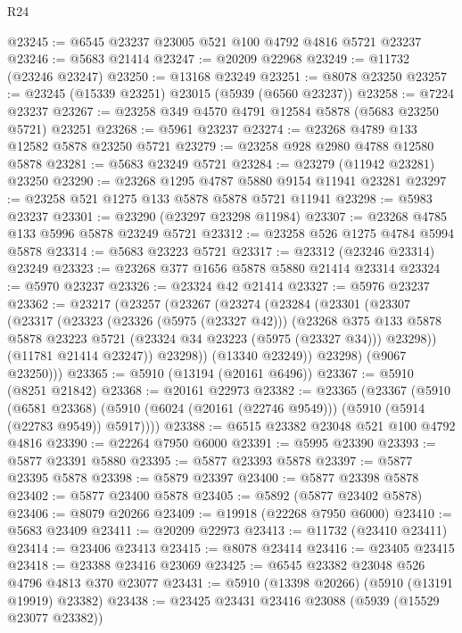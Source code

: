 \begin{lexlean}{R24}
\begin{coremodule}
@23245 := @6545 @23237 @23005 @521 @100 @4792 @4816 @5721 @23237
@23246 := @5683 @21414
@23247 := @20209 @22968
@23249 := @11732 (@23246 @23247)
@23250 := @13168 @23249
@23251 := @8078 @23250
@23257 := @23245 (@15339 @23251) @23015 (@5939 (@6560 @23237))
@23258 := @7224 @23237
@23267 := @23258 @349 @4570 @4791 @12584 @5878 (@5683 @23250 @5721) @23251
@23268 := @5961 @23237
@23274 := @23268 @4789 @133 @12582 @5878 @23250 @5721
@23279 := @23258 @928 @2980 @4788 @12580 @5878
@23281 := @5683 @23249 @5721
@23284 := @23279 (@11942 @23281) @23250
@23290 := @23268 @1295 @4787 @5880 @9154 @11941 @23281
@23297 := @23258 @521 @1275 @133 @5878 @5878 @5721 @11941
@23298 := @5983 @23237
@23301 := @23290 (@23297 @23298 @11984)
@23307 := @23268 @4785 @133 @5996 @5878 @23249 @5721
@23312 := @23258 @526 @1275 @4784 @5994 @5878
@23314 := @5683 @23223 @5721
@23317 := @23312 (@23246 @23314) @23249
@23323 := @23268 @377 @1656 @5878 @5880 @21414 @23314
@23324 := @5970 @23237
@23326 := @23324 @42 @21414
@23327 := @5976 @23237
@23362 := @23217
    (@23257
      (@23267
        (@23274
          (@23284
            (@23301
              (@23307
                (@23317
                  (@23323
                    (@23326 (@5975 (@23327 @42)))
                    (@23268
                      @375
                      @133
                      @5878
                      @5878
                      @23223
                      @5721
                      (@23324 @34 @23223 (@5975 (@23327 @34)))
                      @23298))
                  (@11781 @21414 @23247))
                @23298))
            (@13340 @23249))
          @23298)
        (@9067 @23250)))
@23365 := @5910 (@13194 (@20161 @6496))
@23367 := @5910 (@8251 @21842)
@23368 := @20161 @22973
@23382 := @23365
    (@23367
      (@5910
        (@6581 @23368)
        (@5910 (@6024 (@20161 (@22746 @9549))) (@5910 (@5914 (@22783 @9549)) @5917))))
@23388 := @6515 @23382 @23048 @521 @100 @4792 @4816
@23390 := @22264 @7950 @6000
@23391 := @5995 @23390
@23393 := @5877 @23391 @5880
@23395 := @5877 @23393 @5878
@23397 := @5877 @23395 @5878
@23398 := @5879 @23397
@23400 := @5877 @23398 @5878
@23402 := @5877 @23400 @5878
@23405 := @5892 (@5877 @23402 @5878)
@23406 := @8079 @20266
@23409 := @19918 (@22268 @7950 @6000)
@23410 := @5683 @23409
@23411 := @20209 @22973
@23413 := @11732 (@23410 @23411)
@23414 := @23406 @23413
@23415 := @8078 @23414
@23416 := @23405 @23415
@23418 := @23388 @23416 @23069
@23425 := @6545 @23382 @23048 @526 @4796 @4813 @370 @23077
@23431 := @5910 (@13398 @20266) (@5910 (@13191 @19919) @23382)
@23438 := @23425 @23431 @23416 @23088 (@5939 (@15529 @23077 @23382))

\end{coremodule}
\end{lexlean}
